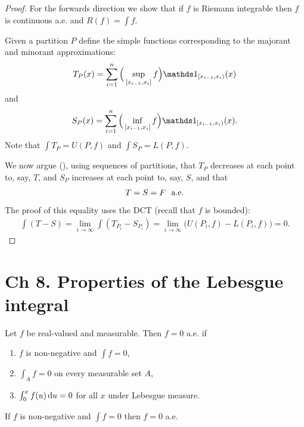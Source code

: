 \begin{proof}
  For the forwards direction we show that if $f$ is Riemann integrable then $f$ is continuous a.e.
  and $R(f) = \int f$.

  Given a partition $P$ define the simple functions corresponding to the majorant and minorant approximations:
  \begin{align*}
    T_P(x) = \sum_{i=1}^n \Big(\sup_{[x_{i-1}, x_i]} f\Big)\ind_{[x_{i-1}, x_i)}(x)
  \end{align*}
  and
  \begin{align*}
    S_P(x) = \sum_{i=1}^n \Big(\inf_{[x_{i-1}, x_i]} f\Big)\ind_{[x_{i-1}, x_i)}(x).
  \end{align*}
  Note that $\int T_P = U(P, f)$ and $\int S_P = L(P, f)$.

  We now argue (), using sequences of partitions, that $T_P$ decreases at each point to, say, $T$, and
  $S_P$ increases at each point to, say, $S$, and that
  \begin{align*}
    T = S = F \text{~~a.e.}
  \end{align*}
  The proof of this equality uses the DCT (recall that $f$ is bounded):
  \begin{align*}
    \int (T - S) = \lim_{i \to \infty} \int (T_{P_i} - S_{P_i}) = \lim_{i\to\infty} \big(U(P_i, f) - L(P_i, f)\big) = 0.
  \end{align*}
\end{proof}

\section{Ch 8. Properties of the Lebesgue integral}

\begin{theorem}[conditions for $f = 0$ a.e.]
  Let $f$ be real-valued and measurable. Then $f = 0$ a.e. if
  \begin{enumerate}
  \item $f$ is non-negative and $\int f = 0$,
  \item $\int_A f = 0$ on every measurable set $A$,
  \item $\int_0^x f(u) \du = 0$ for all $x$ under Lebesgue measure.
  \end{enumerate}
\end{theorem}

\begin{theorem}
  If $f$ is non-negative and $\int f = 0$ then $f = 0$ a.e.
\end{theorem}

